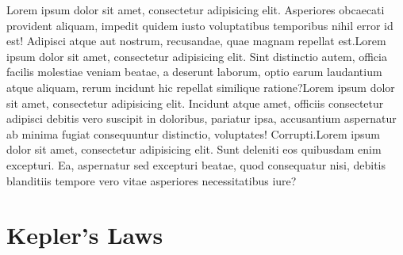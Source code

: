 Lorem ipsum dolor sit amet, consectetur adipisicing elit. Asperiores obcaecati provident aliquam, impedit quidem iusto voluptatibus temporibus nihil error id est! Adipisci atque aut nostrum, recusandae, quae magnam repellat est.Lorem ipsum dolor sit amet, consectetur adipisicing elit. Sint distinctio autem, officia facilis molestiae veniam beatae, a deserunt laborum, optio earum laudantium atque aliquam, rerum incidunt hic repellat similique ratione?Lorem ipsum dolor sit amet, consectetur adipisicing elit. Incidunt atque amet, officiis consectetur adipisci debitis vero suscipit in doloribus, pariatur ipsa, accusantium aspernatur ab minima fugiat consequuntur distinctio, voluptates! Corrupti.Lorem ipsum dolor sit amet, consectetur adipisicing elit. Sunt deleniti eos quibusdam enim excepturi. Ea, aspernatur sed excepturi beatae, quod consequatur nisi, debitis blanditiis tempore vero vitae asperiores necessitatibus iure?























\section{Kepler's Laws}


































